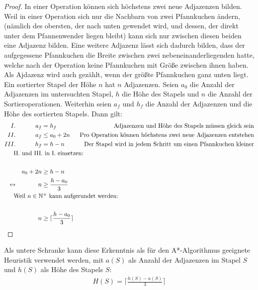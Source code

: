 \documentclass[a4paper,10pt,ngerman]{scrartcl}
\begin{document}
\begin{proof}
In einer Operation können sich höchstens zwei neue Adjazenzen bilden. Weil in einer Operation sich nur die Nachbarn von zwei
Pfannkuchen ändern, (nämlich des obersten, der nach unten gewendet wird, und dessen, der direkt unter dem Pfannenwender liegen bleibt)
kann sich nur zwischen diesen beiden eine Adjazenz bilden. Eine weitere Adjazenz lässt sich dadurch bilden, dass der aufgegessene
Pfannkuchen die Breite zwischen zwei nebeneinanderliegenden hatte, welche nach der Operation keine Pfannkuchen mit Größe zwischen ihnen haben.
Als Ajdazenz wird auch gezählt, wenn der größte Pfannkuchen ganz unten liegt. Ein sortierter Stapel der Höhe $n$ hat $n$ Adjazenzen.
Seien $a_0$ die Anzahl der Adjazenzen im untersuchten Stapel, $h$ die Höhe des Stapels und $n$ die Anzahl der Sortieroperationen. Weiterhin seien
$a_f$ und $h_f$ die Anzahl der Adjazenzen und die Höhe des sortierten Stapels. Dann gilt:
\begin{align*}
  I.              &  & a_f      & = h_f                              & \text{Adjazenzen und Höhe des Stapels müssen gleich sein}            \\
  II.             &  & a_f      & \leq a_0 + 2n                      & \text{Pro Operation können höchstens zwei neue Adjazenzen entstehen} \\
  III.            &  & h_f      & = h - n                            & \text{Der Stapel wird in jedem Schritt um einen Pfannkuchen kleiner} \\
  \noalign{II. und III. in I. einsetzen:}                                                                                                   \\
                  &  & a_0 + 2n & \geq h - n                         &                                                                      \\
  \leftrightarrow &  & n        & \geq \frac{h - a_0}{3}                                                                                    \\
  \noalign{Weil $n \in \mathbb{N}^+$ kann aufgerundet werden:}                                                                              \\
                  &  & n        & \geq \lceil\frac{h - a_0}{3}\rceil                                                                        \\
\end{align*}
\end{proof}
Als untere Schranke kann diese Erkenntnis als für den A*-Algorithmus geeignete Heuristik verwendet werden,
mit $a(S)$ als Anzahl der Adjazenzen im Stapel $S$ und $h(S)$ als Höhe des Stapels $S$:
\begin{align*}
  H(S) = \lceil\frac{h(S) - a(S)}{3}\rceil
\end{align*}
\end{document}
